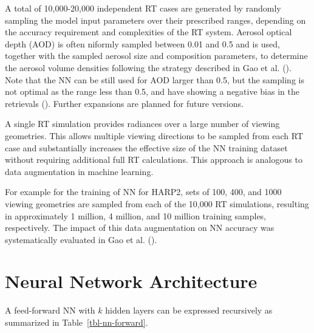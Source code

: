 \documentclass[
  11pt,
  letterpaper,
]{scrreprt}
\begin{document}
A total of 10,000-20,000 independent RT cases are generated by randomly
sampling the model input parameters over their prescribed ranges,
depending on the accuracy requirement and complexities of the RT system.
Aerosol optical depth (AOD) is often niformly sampled between 0.01 and
0.5 and is used, together with the sampled aerosol size and composition
parameters, to determine the aerosol volume densities following the
strategy described in Gao et al. (). Note
that the NN can be still used for AOD larger than 0.5, but the sampling
is not optimal as the range less than 0.5, and have showing a negative
bias in the retrievals ().
Further expansions are planned for future versions.

A single RT simulation provides radiances over a large number of viewing
geometries. This allows multiple viewing directions to be sampled from
each RT case and substantially increases the effective size of the NN
training dataset without requiring additional full RT calculations. This
approach is analogous to data augmentation in machine learning.

For example for the training of NN for HARP2, sets of 100, 400, and 1000
viewing geometries are sampled from each of the 10,000 RT simulations,
resulting in approximately 1 million, 4 million, and 10 million training
samples, respectively. The impact of this data augmentation on NN
accuracy was systematically evaluated in Gao et al.
().

\section{Neural Network Architecture}\label{neural-network-architecture}

A feed-forward NN with \(k\) hidden layers can be expressed recursively
as summarized in Table~\ref{tbl-nn-forward}.
\end{document}
